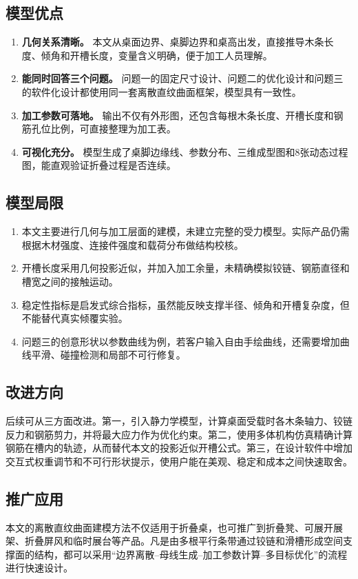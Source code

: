 \documentclass[UTF8,a4paper,12pt]{ctexart}
\begin{document}
\subsection{模型优点}
\begin{enumerate}
\item \textbf{几何关系清晰。} 本文从桌面边界、桌脚边界和桌高出发，直接推导木条长度、倾角和开槽长度，变量含义明确，便于加工人员理解。
\item \textbf{能同时回答三个问题。} 问题一的固定尺寸设计、问题二的优化设计和问题三的软件化设计都使用同一套离散直纹曲面框架，模型具有一致性。
\item \textbf{加工参数可落地。} 输出不仅有外形图，还包含每根木条长度、开槽长度和钢筋孔位比例，可直接整理为加工表。
\item \textbf{可视化充分。} 模型生成了桌脚边缘线、参数分布、三维成型图和8张动态过程图，能直观验证折叠过程是否连续。
\end{enumerate}

\subsection{模型局限}
\begin{enumerate}
\item 本文主要进行几何与加工层面的建模，未建立完整的受力模型。实际产品仍需根据木材强度、连接件强度和载荷分布做结构校核。
\item 开槽长度采用几何投影近似，并加入加工余量，未精确模拟铰链、钢筋直径和槽宽之间的接触运动。
\item 稳定性指标是启发式综合指标，虽然能反映支撑半径、倾角和开槽复杂度，但不能替代真实倾覆实验。
\item 问题三的创意形状以参数曲线为例，若客户输入自由手绘曲线，还需要增加曲线平滑、碰撞检测和局部不可行修复。
\end{enumerate}

\subsection{改进方向}
后续可从三方面改进。第一，引入静力学模型，计算桌面受载时各木条轴力、铰链反力和钢筋剪力，并将最大应力作为优化约束。第二，使用多体机构仿真精确计算钢筋在槽内的轨迹，从而替代本文的投影近似开槽公式。第三，在设计软件中增加交互式权重调节和不可行形状提示，使用户能在美观、稳定和成本之间快速取舍。

\subsection{推广应用}
本文的离散直纹曲面建模方法不仅适用于折叠桌，也可推广到折叠凳、可展开展架、折叠屏风和临时展台等产品。凡是由多根平行条带通过铰链和滑槽形成空间支撑面的结构，都可以采用“边界离散--母线生成--加工参数计算--多目标优化”的流程进行快速设计。
\end{document}
